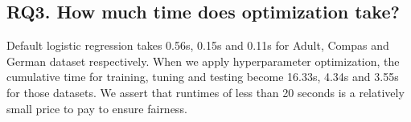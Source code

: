 \documentclass[10pt,conference,review]{IEEEtran}
\begin{document}


\subsection{ RQ3. How much time does optimization take?}

Default logistic regression takes 0.56s, 0.15s and 0.11s for Adult, Compas and German dataset respectively. When we apply hyperparameter optimization, the cumulative time for training, tuning and testing become 16.33s, 4.34s and 3.55s for those datasets. 
We assert that  runtimes of less than 20 seconds is a relatively small price to pay to ensure fairness. 
\end{document}
